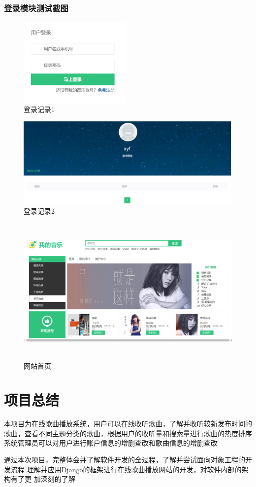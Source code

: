 \documentclass[UTF8,14pt]{article}
\numberwithin{figure}{subsubsection}
\numberwithin{table}{subsubsection}
\begin{document}
\subsubsection{登录模块测试截图}
\begin{minipage}[t]{0.33\linewidth}
	\begin{figure}[H]
		\includegraphics[width=5.51cm,height=4.33cm]{figures/login1.png}
		\caption{登录记录1}
	\end{figure}
\end{minipage}
\hfill
\begin{minipage}[t]{0.66\linewidth}
	\begin{figure}[H]
		\centering
		\includegraphics[width=11.142cm,height=4.428cm]{figures/login2.png}
		\caption{登录记录2}
	\end{figure}
\end{minipage}
\begin{figure}[H]
	\centering
	\includegraphics[width=15.096cm,height=7.31cm]{figures/final.png}
	\caption{网站首页}
\end{figure}
\section{项目总结}
本项目为在线歌曲播放系统，用户可以在线收听歌曲，了解并收听较新发布时间的
歌曲，查看不同主题分类的歌曲，根据用户的收听量和搜索量进行歌曲的热度排序
系统管理员可以对用户进行账户信息的增删查改和歌曲信息的增删查改

通过本次项目，完整体会并了解软件开发的全过程，了解并尝试面向对象工程的开发流程
理解并应用Django的框架进行在线歌曲播放网站的开发，对软件内部的架构有了更
加深刻的了解
\end{document}
